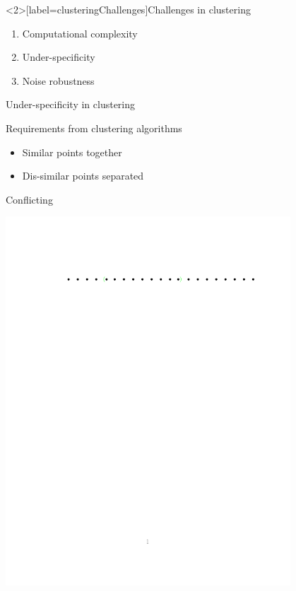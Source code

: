 \documentclass{beamer}
\begin{document}
\begin{frame}<2>[label=clusteringChallenges]{Challenges in clustering}
	\begin{enumerate}
		 \item Computational complexity
		\onslide<2> \vspace{20pt}\item  Under-specificity
		\onslide<3>\vspace{20pt}\item Noise robustness
	\end{enumerate}
\end{frame}

\begin{frame}{Under-specificity in clustering}
	
	Requirements from clustering algorithms\\
	\vspace{10pt}
	\begin{block}{}
		\begin{itemize}
			\item Similar points together
			\item Dis-similar points separated
		\end{itemize}
	\end{block}
	
	\vspace{10pt}\alert{Conflicting}
	\begin{center}
	\includegraphics[trim={100 650 30 120},clip,width=0.8\textwidth]{figures/conflictingReq.pdf}
	\end{center}
\end{frame}
\end{document}

